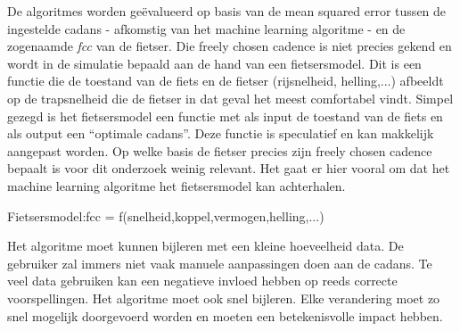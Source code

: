 De algoritmes worden geëvalueerd op basis van de mean squared error tussen de ingestelde cadans - afkomstig van het machine learning algoritme - en de zogenaamde \textit{\gls{fcc}} van de fietser. Die freely chosen cadence is niet precies gekend en wordt in de simulatie bepaald aan de hand van een fietsersmodel. Dit is een functie die de toestand van de fiets en de fietser (rijsnelheid, helling,...) afbeeldt op de trapsnelheid die de fietser in dat geval het meest comfortabel vindt. Simpel gezegd is het fietsersmodel een functie met als input de toestand van de fiets en als output een “optimale cadans”. Deze functie is speculatief en kan makkelijk aangepast worden. Op welke basis de fietser precies zijn freely chosen cadence bepaalt is voor dit onderzoek weinig relevant. Het gaat er hier vooral om dat het machine learning algoritme het fietsersmodel kan achterhalen.
\\
\begin{center}
Fietsersmodel:\tab fcc = f(snelheid,koppel,vermogen,helling,...)
\end{center}
Het algoritme moet kunnen bijleren met een kleine hoeveelheid data. De gebruiker zal immers niet vaak manuele aanpassingen doen aan de cadans. Te veel data gebruiken kan een negatieve invloed hebben op reeds correcte voorspellingen. Het algoritme moet ook snel bijleren. Elke verandering moet zo snel mogelijk doorgevoerd worden en moeten een betekenisvolle impact hebben.
